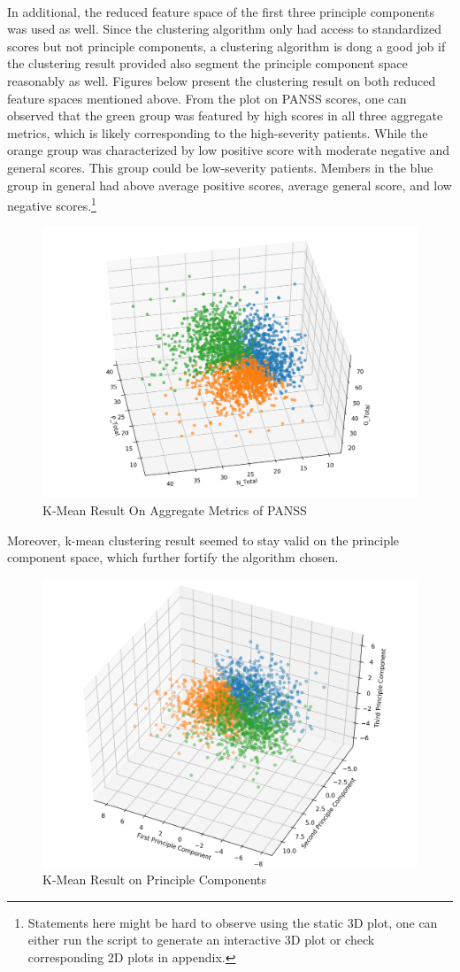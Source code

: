 \documentclass[11pt]{article}
\begin{document}
	\paragraph{} In additional, the reduced feature space of the first three principle components was used as well. Since the clustering algorithm only had access to standardized scores but not principle components, a clustering algorithm is dong a good job if the clustering result provided also segment the principle component space reasonably as well. Figures below present the clustering result on both reduced feature spaces mentioned above. From the plot on PANSS scores, one can observed that the green group was featured by high scores in all three aggregate metrics, which is likely corresponding to the high-severity patients.	While the orange group was characterized by low positive score with moderate negative and general scores. This group could be low-severity patients. Members in the blue group in general had above average positive scores, average general score, and low negative scores.\footnote{Statements here might be hard to observe using the static 3D plot, one can either run the script to generate an interactive 3D plot or check corresponding 2D plots in appendix.}
	\begin{figure}[H]
		\centering
		\includegraphics[width=0.7\linewidth]{figures/kmean_3.png}
		\caption{K-Mean Result On Aggregate Metrics of PANSS}
	\end{figure}
	Moreover, k-mean clustering result seemed to stay valid on the principle component space, which further fortify the algorithm chosen.
	\begin{figure}[H]
		\centering
		\includegraphics[width=0.7\linewidth]{figures/k_mean_on_pca.png}
		\caption{K-Mean Result on Principle Components}
	\end{figure}
	
\end{document}
